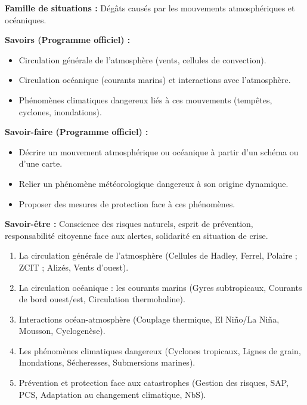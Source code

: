 \documentclass[11pt]{article}
\begin{document}
\begin{aretenir}
    \textbf{Famille de situations :} Dégâts causés par les mouvements atmosphériques et océaniques.
    \par\medskip
    \textbf{Savoirs (Programme officiel) :}
    \begin{itemize}
        \item Circulation générale de l'atmosphère (vents, cellules de convection).
        \item Circulation océanique (courants marins) et interactions avec l'atmosphère.
        \item Phénomènes climatiques dangereux liés à ces mouvements (tempêtes, cyclones, inondations).
    \end{itemize}
    \textbf{Savoir-faire (Programme officiel) :}
    \begin{itemize}
        \item Décrire un mouvement atmosphérique ou océanique à partir d'un schéma ou d'une carte.
        \item Relier un phénomène météorologique dangereux à son origine dynamique.
        \item Proposer des mesures de protection face à ces phénomènes.
    \end{itemize}
    \textbf{Savoir-être :} Conscience des risques naturels, esprit de prévention, responsabilité citoyenne face aux alertes, solidarité en situation de crise.
\end{aretenir}

\begin{aretenir}
    \begin{enumerate}
        \item La circulation générale de l'atmosphère (Cellules de Hadley, Ferrel, Polaire ; ZCIT ; Alizés, Vents d'ouest).
        \item La circulation océanique : les courants marins (Gyres subtropicaux, Courants de bord ouest/est, Circulation thermohaline).
        \item Interactions océan-atmosphère (Couplage thermique, El Niño/La Niña, Mousson, Cyclogenèse).
        \item Les phénomènes climatiques dangereux (Cyclones tropicaux, Lignes de grain, Inondations, Sécheresses, Submersions marines).
        \item Prévention et protection face aux catastrophes (Gestion des risques, SAP, PCS, Adaptation au changement climatique, NbS).
    \end{enumerate}
\end{aretenir}
\end{document}
